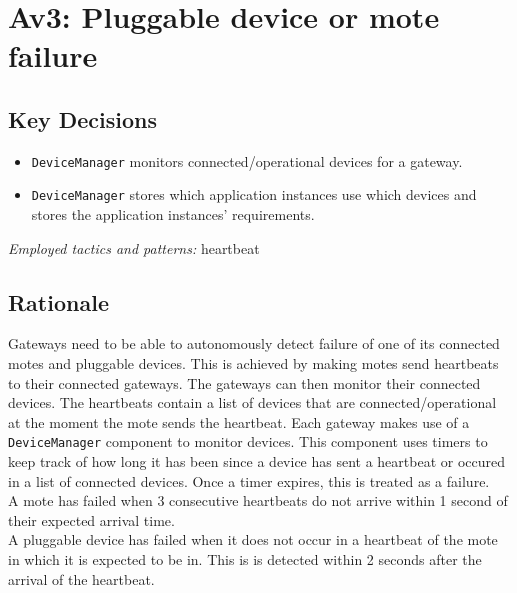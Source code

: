 \section{Av3: Pluggable device or mote failure}

    \subsection*{Key Decisions}

    \begin{itemize}
    	\item \texttt{DeviceManager} monitors connected/operational devices for a gateway.
    	\item \texttt{DeviceManager} stores which application instances use which devices and stores the application instances' requirements.
    \end{itemize}
    \emph{Employed tactics and patterns:} heartbeat

    \subsection*{Rationale}
        Gateways need to be able to autonomously detect failure of one of its
        connected motes and pluggable devices. This is achieved by making motes
        send heartbeats to their connected gateways. The gateways can
        then monitor their connected devices. The heartbeats contain a list
        of devices that are connected/operational at the moment the mote sends
        the heartbeat. Each gateway makes use of a \texttt{DeviceManager}
        component to monitor devices. This component uses timers to keep track
        of how long it has been since a device has sent a heartbeat or occured in
        a list of connected devices. Once a timer expires, this is treated as
        a failure. \\
        A mote has failed when 3 consecutive heartbeats do not arrive within 1
        second of their expected arrival time. \\
        A pluggable device has failed when it does not occur in a heartbeat of the
        mote in which it is expected to be in. This is is detected within 2
        seconds after the arrival of the heartbeat. \\

